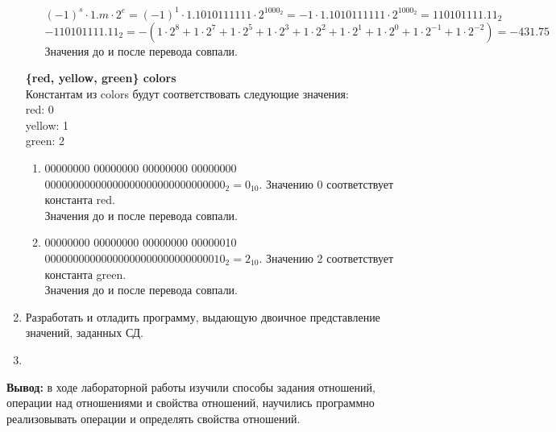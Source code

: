 \documentclass[a4paper,14pt]{extarticle}
\begin{document}
\begin{enumerate}
\begin{enumerate}[1. ]
  $(-1)^s \cdot 1.m \cdot 2^e = (-1)^1 \cdot 1.1010111111 \cdot 2^{1000_2} = 
  -1 \cdot 1.1010111111 \cdot 2^{1000_2} = 110101111.11_2$\\
  $-110101111.11_2 = -(1 \cdot 2 ^ 8 + 1 \cdot 2 ^ 7 + 1 \cdot 2 ^ 5 + 1 \cdot 2 ^ 3 + 1 \cdot 2 ^ 2 + 
  1 \cdot 2 ^ 1 + 1 \cdot 2 ^ 0 + 1 \cdot 2 ^ {-1} + 1 \cdot 2 ^ {-2}) = -431.75$\\
  Значения до и после перевода совпали.
\end{enumerate}
\textbf{\{red, yellow, green\} colors}\\
Константам из colors будут соответствовать следующие значения:\\
red: 0\\
yellow: 1\\
green: 2\\
\begin{enumerate}[1. ]
  \item 00000000 00000000 00000000 00000000\\
  $00000000 00000000 00000000 00000000_2 = 0_{10}$. Значению 0 соответствует константа red.\\
  Значения до и после перевода совпали.
  \item 00000000 00000000 00000000 00000010\\
  $00000000 00000000 00000000 00000010_2 = 2_{10}$. Значению 2 соответствует константа green.\\
  Значения до и после перевода совпали.
\end{enumerate}
\item Разработать и отладить программу, выдающую двоичное представление значений, заданных СД.\\
\item 
\end{enumerate}
\textbf{Вывод: } в ходе лабораторной работы изучили способы задания отношений, операции над отношениями и свойства отношений, научились программно реализовывать операции и определять свойства отношений.
\end{document}
